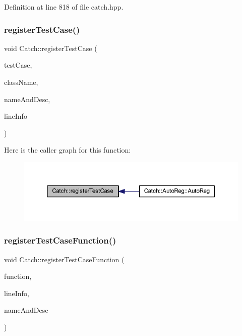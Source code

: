 Definition at line 818 of file catch.\+hpp.

\hypertarget{namespace_catch_a9a59d681cc327a33c280796561dfe258}{}\label{namespace_catch_a9a59d681cc327a33c280796561dfe258} 
\subsubsection{\texorpdfstring{register\+Test\+Case()}{registerTestCase()}}
{\footnotesize\ttfamily void Catch\+::register\+Test\+Case (\begin{DoxyParamCaption}\item[{\hyperlink{struct_catch_1_1_i_test_case}{I\+Test\+Case} $\ast$}]{test\+Case,  }\item[{char const $\ast$}]{class\+Name,  }\item[{\hyperlink{struct_catch_1_1_name_and_desc}{Name\+And\+Desc} const \&}]{name\+And\+Desc,  }\item[{\hyperlink{struct_catch_1_1_source_line_info}{Source\+Line\+Info} const \&}]{line\+Info }\end{DoxyParamCaption})}

Here is the caller graph for this function\+:\nopagebreak
\begin{figure}[H]
\begin{center}
\leavevmode
\includegraphics[width=350pt]{namespace_catch_a9a59d681cc327a33c280796561dfe258_icgraph}
\end{center}
\end{figure}
\hypertarget{namespace_catch_a220159aeff47f9c5231e893f2abbc643}{}\label{namespace_catch_a220159aeff47f9c5231e893f2abbc643} 
\subsubsection{\texorpdfstring{register\+Test\+Case\+Function()}{registerTestCaseFunction()}}
{\footnotesize\ttfamily void Catch\+::register\+Test\+Case\+Function (\begin{DoxyParamCaption}\item[{\hyperlink{namespace_catch_a26414f52d0835939fae52aadd27e6257}{Test\+Function}}]{function,  }\item[{\hyperlink{struct_catch_1_1_source_line_info}{Source\+Line\+Info} const \&}]{line\+Info,  }\item[{\hyperlink{struct_catch_1_1_name_and_desc}{Name\+And\+Desc} const \&}]{name\+And\+Desc }\end{DoxyParamCaption})}

